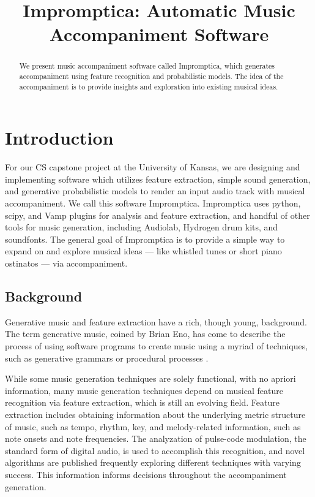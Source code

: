 \documentclass[11pt,conference,letterpaper]{IEEEtran}
\begin{document}
\title{Impromptica: Automatic Music Accompaniment Software}
\author{}

\maketitle

\begin{abstract}
We present music accompaniment software called Impromptica, which generates accompaniment using feature recognition and probabilistic models. The idea of the accompaniment is to provide insights and exploration into existing musical ideas.
\end{abstract}

\section{Introduction}

For our CS capstone project at the University of Kansas, we are designing and implementing software which utilizes feature extraction, simple sound generation, and generative probabilistic models to render an input audio track with musical accompaniment. We call this software Impromptica. Impromptica uses python, scipy, and Vamp plugins for analysis and feature extraction, and handful of other tools for music generation, including Audiolab, Hydrogen drum kits, and soundfonts. The general goal of Impromptica is to provide a simple way to expand on and explore musical ideas --- like whistled tunes or short piano ostinatos --- via accompaniment.

\subsection{Background}

Generative music and feature extraction have a rich, though young, background. The term generative music, coined by Brian Eno, has come to describe the process of using software programs to create music using a myriad of techniques, such as generative grammars or procedural processes \cite{wooller2005framework}. 

While some music generation techniques are solely functional, with no apriori information, many music generation techniques depend on musical feature recognition via feature extraction, which is still an evolving field. Feature extraction includes obtaining information about the underlying metric structure of music, such as tempo, rhythm, key, and melody-related information, such as note onsets and note frequencies. The analyzation of pulse-code modulation, the standard form of digital audio, is used to accomplish this recognition, and novel algorithms are published frequently exploring different techniques with varying success. This information informs decisions throughout the accompaniment generation. 
\end{document}
